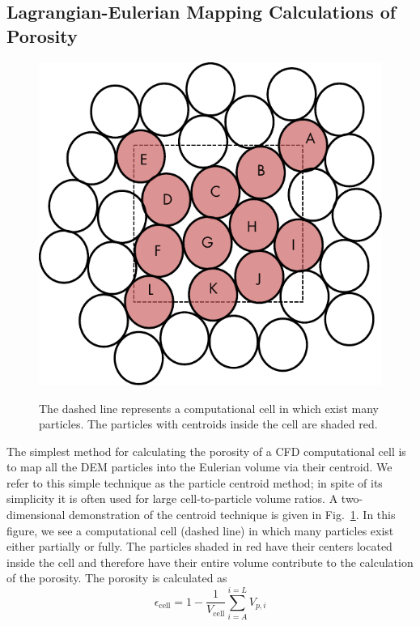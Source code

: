 \subsection{Lagrangian-Eulerian Mapping Calculations of Porosity}
\begin{figure}[t]
	\centering
	\caption{The dashed line represents a computational cell in which exist many particles. The particles with centroids inside the cell are shaded red.}
	\includegraphics[width=\singleimagewidth]{chapters/figures/void-fraction-cell.pdf}\label{fig:centroid-void-fraction}
\end{figure}
The simplest method for calculating the porosity of a CFD computational cell is to map all the DEM particles into the Eulerian volume via their centroid. We refer to this simple technique as the particle centroid method; in spite of its simplicity it is often used for large cell-to-particle volume ratios.\cite{Xu1997} A two-dimensional demonstration of the centroid technique is given in Fig.~\ref{fig:centroid-void-fraction}. In this figure, we see a computational cell (dashed line) in which many particles exist either partially or fully. The particles shaded in red have their centers located inside the cell and therefore have their entire volume contribute to the calculation of the porosity. The porosity is calculated as
\begin{equation}
	\epsilon_\text{cell} = 1-\frac{1}{V_\text{cell}}\sum_{i = A}^{i=L}V_{p,i}
\end{equation}

